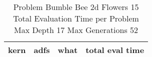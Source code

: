 \begin{table}[H]
\caption{Problem  Bumble Bee 2d  Flowers 15\\Total Evaluation Time per Problem \\ Max Depth 17 Max Generations 52\\}
\begin{center}
\scalebox{1.0} %
{
\begin{tabular}{lllr}
\hline
kern & adfs & what & total eval time \\
\hline


\end{tabular}
}
\end{center}
\end{table}

